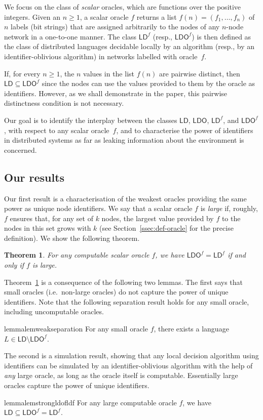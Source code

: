 \documentclass[11pt,a4paper]{article}
\newtheorem{theorem}{Theorem}
\theoremstyle{definition}
\theoremstyle{remark}
\newcommand{\ldo}{\mathsf{LDO}}
\newcommand{\ld}{\mathsf{LD}}
\begin{document}
We focus on the class of \emph{scalar} oracles, which are functions over the positive integers. Given an $n\geq 1$, a scalar oracle $f$ returns a list $f(n)=(f_1,\dots,f_n)$ of $n$ labels (bit strings) that are assigned arbitrarily to the nodes of any $n$-node network in a one-to-one manner. The class $\ld^f$ (resp., $\ldo^f$) is then defined as the class of distributed languages  decidable locally by an algorithm (resp., by an identifier-oblivious algorithm) in networks labelled with oracle~$f$.

If, for every $n\geq 1$, the $n$ values in the list $f(n)$ are pairwise distinct, then $\ld \subseteq \ldo^f$ since the nodes can use the values provided to them by the oracle as identifiers. However, as we shall demonstrate in the paper, this pairwise distinctness condition is not necessary.

Our goal is to identify the interplay between the classes $\ld$, $\ldo$, $\ld^f$, and $\ldo^f$, with respect to any scalar oracle~$f$, and to characterise  the power of identifiers in distributed systems as far as leaking information about the environment is concerned. 

\subsection{Our results}

Our first result is a characterisation of the weakest oracles providing the same power as unique node identifiers. We say that a scalar oracle $f$ is \emph{large} if, roughly, $f$ ensures that, for any set of $k$ nodes, the largest value provided by $f$ to the nodes in this set grows with $k$ (see Section~\ref{ssec:def-oracle} for the precise definition). We show the following theorem.
\begin{theorem} \label{thm:main}
    For any computable scalar oracle $f$, we have $\ldo^f = \ld^f$ if and only if $f$ is large.
\end{theorem}

Theorem~\ref{thm:main} is a consequence of the following two lemmas. The first says that small oracles (i.e.\ non-large oracles) do not capture the power of unique identifiers. Note that the following separation result holds for any small oracle, including uncomputable oracles.
\begin{restatable}{lemma}{lemweakseparation} \label{lem:weak-separation}
    For any small oracle $f$, there exists a language $L \in \ld \setminus \ldo^{f}$.
\end{restatable}
The second is a simulation result, showing that any local decision algorithm using identifiers can be simulated by an identifier-oblivious algorithm with the help of \emph{any} large oracle, as long as the oracle itself is computable. Essentially large oracles capture the power of unique identifiers.
\begin{restatable}{lemma}{lemstrongldofldf} \label{lem:strong-ldof-ldf}
    For any large computable oracle $f$, we have $\ld \subseteq \ldo^f = \ld^f$.
\end{restatable}
\end{document}
